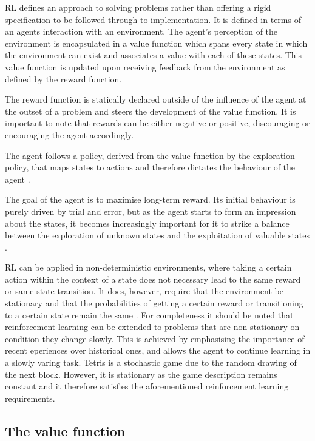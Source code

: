 \documentclass{rucsthesis}
\begin{document}
RL defines an approach to solving problems rather than offering a rigid specification to be followed through to implementation. It is defined in terms of an agents interaction with an environment. The agent's perception of the environment is encapsulated in a value function which spans every state in which the environment can exist and associates a value with each of these states. This value function is updated upon receiving feedback from the environment as defined by the reward function.

The reward function is statically declared outside of the influence of the agent at the outset of a problem and steers the development of the value function. It is important to note that rewards can be either negative or positive, discouraging or encouraging the agent accordingly. 

The agent follows a policy, derived from the value function by the exploration policy, that maps states to actions and therefore dictates the behaviour of the agent \citep{suttonbarto}.

The goal of the agent is to maximise long-term reward. Its initial behaviour is purely driven by trial and error, but as the agent starts to form an impression about the states, it becomes increasingly important for it to strike a balance between the exploration of unknown states and the exploitation of valuable states \citep{suttonbarto}.

RL can be applied in non-deterministic environments, where taking a certain action within the context of a state does not necessary lead to the same reward or same state transition. It does, however, require that the environment be stationary and that the probabilities of getting a certain reward or transitioning to a certain state remain the same \citep{kaelbling96reinforcement}. For completeness it should be noted that reinforcement learning can be extended to problems that are non-stationary on condition they change slowly. This is achieved by emphasising the importance of recent eperiences over historical ones, and allows the agent to continue learning in a slowly varing task. Tetris is a stochastic game due to the random drawing of the next block. However, it is stationary as the game description remains constant and it therefore satisfies the aforementioned reinforcement learning requirements.

\subsection{The value function \label{sec:valfunc}}
\end{document}
